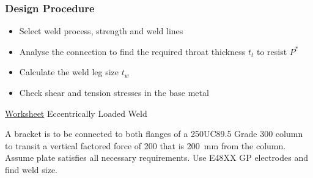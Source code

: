 \subsubsection{Design Procedure}
\begin{itemize}
\item Select weld process, strength and weld lines
\item Analyse the connection to find the required throat thickness $t_t$ to resist $P^*$
\item Calculate the weld leg size $t_w$
\item Check shear and tension stresses in the base metal
\end{itemize}
\begin{exmp}\href{run:./WORKSHEET/CH08/EX8.ECLW.sm}{Worksheet} Eccentrically Loaded Weld

A bracket is to be connected to both flanges of a 250UC89.5 Grade 300 column to transit a vertical factored force of \SI{200}{\kn} that is \SI{200}{\mm} from the column. Assume plate satisfies all necessary requirements. Use E48XX GP electrodes and find weld size.
\begin{figure}[H]
\end{figure}
\end{exmp}
